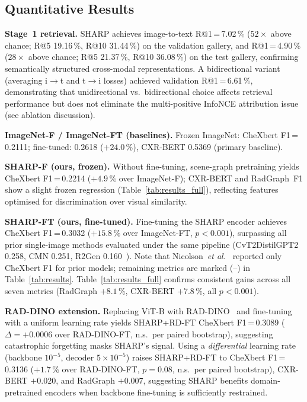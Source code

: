 \documentclass[runningheads]{llncs}
\newcommand{\etal}{\emph{et al.}}
\begin{document}
\subsection{Quantitative Results}

\noindent\textbf{Stage~1 retrieval.}
SHARP achieves image-to-text R@1\,=\,7.02\,\% ($52{\times}$ above
chance; R@5 19.16\,\%, R@10 31.44\,\%) on the validation gallery, and
R@1\,=\,4.90\,\% ($28{\times}$ above chance; R@5 21.37\,\%, R@10 36.08\,\%)
on the test gallery, confirming semantically structured cross-modal
representations.
A bidirectional variant (averaging i$\to$t and t$\to$i losses) achieved
validation R@1\,=\,6.61\,\%, demonstrating that unidirectional vs.\ bidirectional
choice affects retrieval performance but does not eliminate the multi-positive
InfoNCE attribution issue (see ablation discussion).

\noindent\textbf{ImageNet-F / ImageNet-FT (baselines).}
Frozen ImageNet: CheXbert F1\,=\,0.2111;
fine-tuned: 0.2618 ($+24.0\,\%$), CXR-BERT 0.5369 (primary baseline).

\noindent\textbf{SHARP-F (ours, frozen).}
Without fine-tuning, scene-graph pretraining yields CheXbert
F1\,=\,0.2214 ($+4.9\,\%$ over ImageNet-F); CXR-BERT and RadGraph~F1
show a slight frozen regression (Table~\ref{tab:results_full}),
reflecting features optimised for discrimination over visual similarity.

\noindent\textbf{SHARP-FT (ours, fine-tuned).}
Fine-tuning the SHARP encoder achieves CheXbert F1\,=\,0.3032
($+15.8\,\%$ over ImageNet-FT, $p{<}0.001$), surpassing all prior
single-image methods evaluated under the same pipeline
(CvT2DistilGPT2 0.258, CMN 0.251, R2Gen 0.160~\cite{cxrmate}).
Note that Nicolson~\etal~\cite{cxrmate} reported only CheXbert F1
for prior models; remaining metrics are marked (--) in Table~\ref{tab:results}.
Table~\ref{tab:results_full} confirms consistent gains across all
seven metrics (RadGraph $+8.1\,\%$, CXR-BERT $+7.8\,\%$,
all $p{<}0.001$).

\noindent\textbf{RAD-DINO extension.}
Replacing ViT-B with RAD-DINO~\cite{raddino} and fine-tuning with a
uniform learning rate yields SHARP+RD-FT CheXbert F1\,=\,0.3089
($\Delta{=}+0.0006$ over RAD-DINO-FT, n.s.\ per paired bootstrap),
suggesting catastrophic forgetting masks SHARP's signal.
Using a \emph{differential} learning rate (backbone $10^{-5}$,
decoder $5{\times}10^{-5}$) raises SHARP+RD-FT to CheXbert
F1\,=\,0.3136 ($+1.7\,\%$ over RAD-DINO-FT, $p{=}0.08$, n.s.\
per paired bootstrap), CXR-BERT $+0.020$, and RadGraph $+0.007$,
suggesting SHARP benefits domain-pretrained encoders when backbone
fine-tuning is sufficiently restrained.
\end{document}
